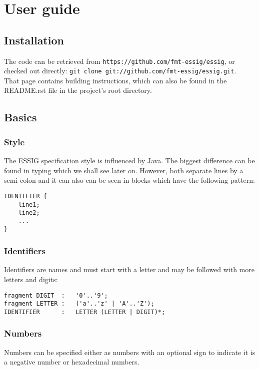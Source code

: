 \chapter{User guide}


\section{Installation}
The code can be retrieved from \texttt{https://github.com/fmt-essig/essig}, or
checked out directly: \texttt{git clone git://github.com/fmt-essig/essig.git}.\\



That page contains building instructions, which can also be
found in the README.rst file in the project's root directory.

\section{Basics}
\subsection{Style}
The \ac{ESSIG} specification style is influenced by Java. The biggest
difference can be found in typing which we shall see later on. However, both
separate lines by a semi-colon and it can also can be seen in blocks which have
the following pattern:

\lstset{caption=Block specification pattern}
\begin{lstlisting}
IDENTIFIER {
	line1;
	line2;
	...
}
\end{lstlisting}


\subsection[IDENTIFIER]{Identifiers}
Identifiers are names and must start with a letter and may be followed with
more letters and digits:

\lstset{caption=Identifier specifation}
\begin{lstlisting}
fragment DIGIT	:	'0'..'9';
fragment LETTER	:	('a'..'z' | 'A'..'Z');
IDENTIFIER		:	LETTER (LETTER | DIGIT)*;
\end{lstlisting}

\subsection{Numbers}
Numbers can be specified either as numbers with an optional sign to indicate it
is a negative number or hexadecimal numbers.

